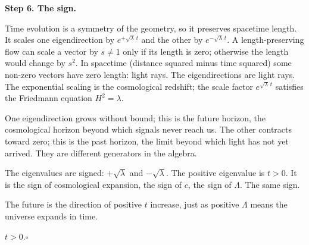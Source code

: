 \documentclass[11pt]{article}
\begin{document}
\textbf{Step 6.\; The sign.}

Time evolution is a symmetry of the geometry, so it preserves spacetime length. It scales one eigendirection by $e^{+\sqrt{\lambda}\,t}$ and the other by $e^{-\sqrt{\lambda}\,t}$. A length-preserving flow can scale a vector by $s \neq 1$ only if its length is zero; otherwise the length would change by $s^2$. In spacetime (distance squared minus time squared) some non-zero vectors have zero length: light rays. The eigendirections are light rays. The exponential scaling is the cosmological redshift; the scale factor $e^{\sqrt{\lambda}\,t}$ satisfies the Friedmann equation $H^2 = \lambda$.

One eigendirection grows without bound; this is the future horizon, the cosmological horizon beyond which signals never reach us. The other contracts toward zero; this is the past horizon, the limit beyond which light has not yet arrived. They are different generators in the algebra.

The eigenvalues are signed: $+\sqrt{\lambda}$ and $-\sqrt{\lambda}$. The positive eigenvalue is $t > 0$. It is the sign of cosmological expansion, the sign of $c$, the sign of $\Lambda$. The same sign.

The future is the direction of positive $t$ increase, just as positive $\Lambda$ means the universe expands in time.

$t > 0$.\hfill$\square$
\end{document}
